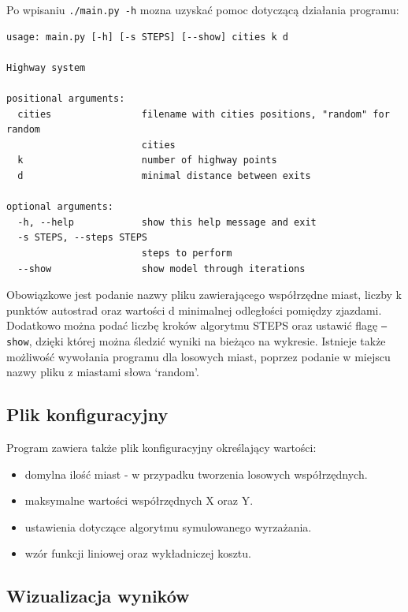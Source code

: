 \documentclass[a4paper]{article}
\begin{document}
Po wpisaniu \texttt{./main.py -h} mozna uzyskać pomoc dotyczącą działania programu:
\begin{lstlisting}[basicstyle=\ttfamily\selectfont\footnotesize]
usage: main.py [-h] [-s STEPS] [--show] cities k d

Highway system

positional arguments:
  cities                filename with cities positions, "random" for random
                        cities
  k                     number of highway points
  d                     minimal distance between exits

optional arguments:
  -h, --help            show this help message and exit
  -s STEPS, --steps STEPS
                        steps to perform
  --show                show model through iterations
\end{lstlisting}

Obowiązkowe jest podanie nazwy pliku zawierającego współrzędne miast, liczby k punktów autostrad oraz wartości d minimalnej odległości pomiędzy zjazdami.\newline
Dodatkowo można podać liczbę kroków algorytmu STEPS oraz ustawić flagę \texttt{--show}, dzięki której można śledzić wyniki na bieżąco na wykresie.\newline
Istnieje także możliwość wywołania programu dla losowych miast, poprzez podanie w miejscu nazwy pliku z miastami słowa `random'. 

\subsection{Plik konfiguracyjny}

Program zawiera także plik konfiguracyjny określający wartości:
\begin{itemize}
\item domylna ilość miast - w przypadku tworzenia losowych współrzędnych.
\item maksymalne wartości współrzędnych X oraz Y.
\item ustawienia dotyczące algorytmu symulowanego wyrzażania.
\item wzór funkcji liniowej oraz wykładniczej kosztu.
\end{itemize}

\subsection{Wizualizacja wyników}
\end{document}

